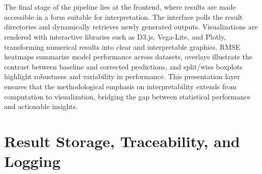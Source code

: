 \\\\The final stage of the pipeline lies at the frontend, where results are made accessible in a form suitable for interpretation. The interface polls the result directories and dynamically retrieves newly generated outputs. Visualizations are rendered with interactive libraries such as D3.js, Vega-Lite, and Plotly, transforming numerical results into clear and interpretable graphics. RMSE heatmaps summarize model performance across datasets, overlays illustrate the contrast between baseline and corrected predictions, and split/wise boxplots highlight robustness and variability in performance. This presentation layer ensures that the methodological emphasis on interpretability extends from computation to visualization, bridging the gap between statistical performance and actionable insights.



\section{Result Storage, Traceability, and Logging}

